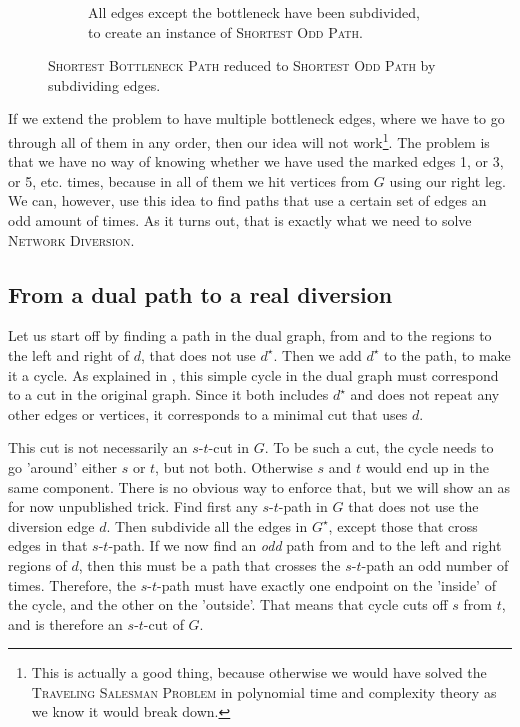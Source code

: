 \begin{figure}[h]
\begin{subfigure}{.80\textwidth}
        \caption{All edges except the bottleneck have been subdivided, to create an instance of \textsc{Shortest Odd Path}.}
        \label{figure:subdivided-bottleneck}
    \end{subfigure}%
    \caption{\textsc{Shortest Bottleneck Path} reduced to \textsc{Shortest Odd Path} by subdividing edges.}
    \label{figure:bottleneck-subdividing}
\end{figure}

If we extend the problem to have multiple bottleneck edges, where we have to go through all of them in any order, then our idea will not work\footnote{This is actually a good thing, because otherwise we would have solved the \textsc{Traveling Salesman Problem} in polynomial time and complexity theory as we know it would break down.}.
The problem is that we have no way of knowing whether we have used the marked edges 1, or 3, or 5, etc. times, because in all of them we hit vertices from $G$ using our right leg. We can, however, use this idea to find paths that use a certain set of edges an odd amount of times. As it turns out, that is exactly what we need to solve \textsc{Network Diversion}.

\subsection{From a dual path to a real diversion}
Let us start off by finding a path in the dual graph, from and to the regions to the left and right of $d$, that does not use $d^\star$. Then we add $d^\star$ to the path, to make it a cycle. As explained in , this simple cycle in the dual graph must correspond to a cut in the original graph. Since it both includes $d^\star$ and does not repeat any other edges or vertices, it corresponds to a minimal cut that uses $d$.

This cut is not necessarily an $s$-$t$-cut in $G$. To be such a cut, the cycle needs to go 'around' either $s$ or $t$, but not both. Otherwise $s$ and $t$ would end up in the same component. There is no obvious way to enforce that, but we will show an as for now unpublished trick. Find first any $s$-$t$-path in $G$ that does not use the diversion edge $d$. Then subdivide all the edges in $G^\star$, except those that cross edges in that $s$-$t$-path. If we now find an \emph{odd} path from and to the left and right regions of $d$, then this must be a path that crosses the $s$-$t$-path an odd number of times. Therefore, the $s$-$t$-path must have exactly one endpoint on the 'inside' of the cycle, and the other on the 'outside'. That means that cycle cuts off $s$ from $t$, and is therefore an $s$-$t$-cut of $G$. 

